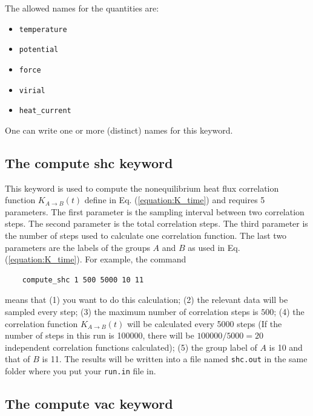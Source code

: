 \documentclass[12pt,a4paper]{report}
\begin{document}
The allowed names for the quantities are:
\begin{itemize}
\item \verb"temperature"
\item \verb"potential"
\item \verb"force"
\item \verb"virial"
\item \verb"heat_current"
\end{itemize}
One can write one or more (distinct) names for this keyword.


\subsection{The compute shc keyword}

This keyword is used to compute the nonequilibrium heat flux correlation function $K_{A \rightarrow B}(t)$ define in Eq. (\ref{equation:K_time}) and requires 5 parameters. The first parameter is the sampling interval between two correlation steps. The second parameter is the total correlation steps. The third parameter is the number of steps used to calculate one correlation function. The last two parameters are the labels of the groups $A$ and $B$ as used in Eq. (\ref{equation:K_time}). For example, the command
\begin{verbatim}
    compute_shc 1 500 5000 10 11
\end{verbatim}
means that (1) you want to do this calculation; (2) the relevant data will be sampled every step; (3) the maximum number of correlation steps is $500$; (4) the correlation function $K_{A \rightarrow B}(t)$ will be calculated every 5000 steps (If the number of steps in this run is 100000, there will be $100000/5000=20$ independent correlation functions calculated); (5) the group label of $A$ is 10 and that of $B$ is 11. The results will be written into a file named \verb"shc.out" in the same folder where you put your \verb"run.in" file in.


\subsection{The compute vac keyword}
\end{document}
